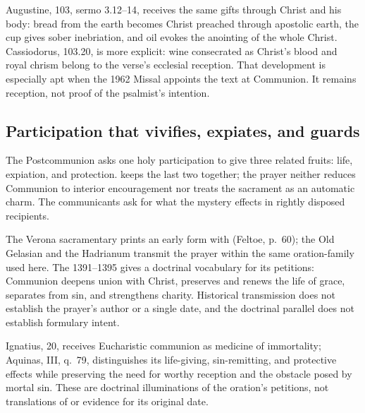 Augustine,  103, sermo 3.12--14, receives the same
gifts through Christ and his body: bread from the earth becomes Christ preached
through apostolic earth, the cup gives sober inebriation, and oil evokes the
anointing of the whole Christ. Cassiodorus, 
103.20, is more explicit: wine consecrated as Christ's blood and royal chrism
belong to the verse's ecclesial reception.
That development is especially apt when the 1962 Missal appoints the text at
Communion. It remains reception, not proof of the psalmist's intention.

\elementguard
\subsection*{Participation that vivifies, expiates, and guards }

The Postcommunion asks one holy participation to give three related fruits:
life, expiation, and protection.  keeps the last two together;
the prayer neither reduces Communion to interior encouragement nor treats the
sacrament as an automatic charm. The communicants ask for what the mystery
effects in rightly disposed recipients.

The Verona sacramentary prints an early form with  (Feltoe, p.~60); the Old Gelasian and the Hadrianum transmit
the prayer within the same oration-family used here. The 
1391--1395 gives a doctrinal vocabulary for its petitions: Communion deepens
union with Christ, preserves and renews the life of grace, separates from sin,
and strengthens charity. Historical transmission does not establish the
prayer's author or a single date, and the doctrinal parallel does not establish
formulary intent.

Ignatius,  20, receives Eucharistic communion as
medicine of immortality; Aquinas,  III, q.~79, distinguishes its
life-giving, sin-remitting, and protective effects while preserving the need
for worthy reception and the obstacle posed by mortal sin. These are doctrinal
illuminations of the oration's petitions, not translations of
 or evidence for its original date.
